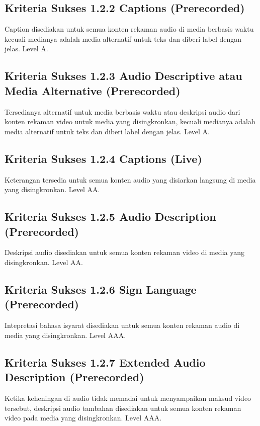 \subsection{Kriteria Sukses 1.2.2 Captions (Prerecorded)}
\label{sec:kriteria_1.2.2}
Caption disediakan untuk semua konten rekaman audio di media berbasis waktu kecuali medianya adalah media alternatif untuk teks dan diberi label dengan jelas.
Level A.

\subsection{Kriteria Sukses 1.2.3 Audio Descriptive atau Media Alternative (Prerecorded)}
\label{sec:kriteria_1.2.3}
Tersedianya alternatif untuk media berbasis waktu atau deskripsi audio dari konten rekaman video untuk media yang disingkronkan, kecuali medianya adalah media alternatif untuk teks dan diberi label dengan jelas.
Level A.

\subsection{Kriteria Sukses 1.2.4 Captions (Live)}
\label{sec:kriteria_1.2.4}
Keterangan tersedia untuk semua konten audio yang disiarkan langsung di media yang disingkronkan.
Level AA.

\subsection{Kriteria Sukses 1.2.5 Audio Description (Prerecorded)}
\label{sec:kriteria_1.2.5}
Deskripsi audio disediakan untuk semua konten rekaman video di media yang disingkronkan.
Level AA.

\subsection{Kriteria Sukses 1.2.6 Sign Language (Prerecorded)}
\label{sec:kriteria_1.2.6}
Intepretasi bahasa isyarat disediakan untuk semua konten rekaman audio di media yang disingkronkan.
Level AAA.

\subsection{Kriteria Sukses 1.2.7 Extended Audio Description (Prerecorded)}
\label{sec:kriteria_1.2.7}
Ketika keheningan di audio tidak memadai untuk menyampaikan maksud video tersebut, deskripsi audio tambahan disediakan untuk semua konten rekaman video pada media yang disingkronkan. 
Level AAA.

